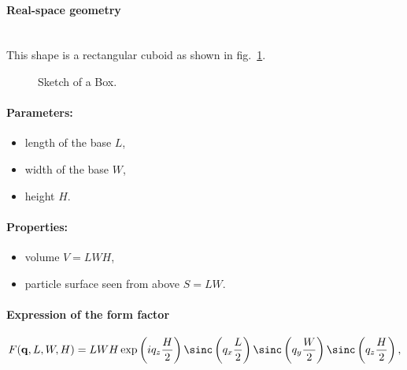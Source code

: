 \paragraph{Real-space geometry}\mbox{}\\
This shape is a rectangular cuboid as
shown in fig.~\ref{fig:box}. 

\begin{figure}[ht]
\hfill
{}
\hfill
{}
\hfill
\caption{Sketch of a Box.}
\label{fig:box}
\end{figure}

\FloatBarrier

\paragraph{Parameters:}
\begin{itemize}
\item length of the base $L$,
\item width of the base $W$,
\item height  $H$.
\end{itemize}

\paragraph{Properties:}
\begin{itemize}
\item volume $V= LWH$,
\item particle surface seen from above $S = LW$.
\end{itemize}

\paragraph{Expression of the form factor}
\begin{equation*}
F(\mathbf{q},L,W,H)= L W H\exp\left(i q_z \frac{H}{2}\right) \sinc\left(q_x \frac{L}{2}\right)
\sinc\left(q_y \frac{W}{2}\right) \sinc\left(q_z \frac{H}{2}\right),
\end{equation*}
   
